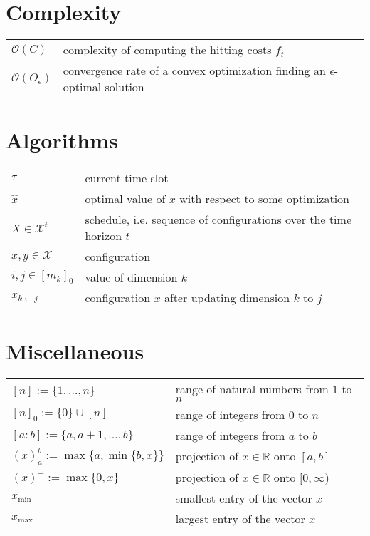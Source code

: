 \section*{Complexity}

\begin{tabularx}{\textwidth}{lX}
    $\mathcal{O}(C)$ & complexity of computing the hitting costs $f_t$ \\
    $\mathcal{O}(O_{\epsilon})$ & convergence rate of a convex optimization finding an $\epsilon$-optimal solution \\
\end{tabularx}

\vspace{\fill}

\section*{Algorithms}

\begin{tabularx}{\textwidth}{lX}
    $\tau$ & current time slot \\
    $\hat{x}$ & optimal value of $x$ with respect to some optimization \\
    $X \in \mathcal{X}^t$ & schedule, i.e. sequence of configurations over the time horizon $t$ \\
    $x, y \in \mathcal{X}$ & configuration \\
    $i, j \in [m_k]_0$ & value of dimension $k$ \\
    $x_{k \gets j}$ & configuration $x$ after updating dimension $k$ to $j$ \\
\end{tabularx}

\section*{Miscellaneous}

\begin{tabularx}{\textwidth}{lX}
    $[n] := \{1, \dots, n\}$ & range of natural numbers from $1$ to $n$ \\
    $[n]_0 := \{0\} \cup [n]$ & range of integers from $0$ to $n$ \\
    $[a : b] := \{a, a+1, \dots, b\}$ & range of integers from $a$ to $b$ \\
    $(x)_a^b := \max\{a, \min\{b, x\}\}$ & projection of $x \in \mathbb{R}$ onto $[a,b]$ \\
    $(x)^+ := \max\{0, x\}$ & projection of $x \in \mathbb{R}$ onto $[0, \infty)$ \\
    $x_{\text{min}}$ & smallest entry of the vector $x$ \\
    $x_{\text{max}}$ & largest entry of the vector $x$ \\
\end{tabularx}
